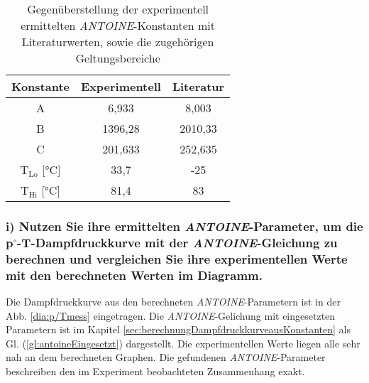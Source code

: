 \begin{table}[h!]
	\centering
	\caption{Gegenüberstellung der experimentell ermittelten \textit{ANTOINE}-Konstanten mit Literaturwerten, sowie die zugehörigen Geltungsbereiche}
	\label{tab:AntoineKonstanten}
	\begin{tabular}{|c|c|c|}
		\hline
			\textbf{Konstante} & \textbf{Experimentell} & \textbf{Literatur} \\ 
			\hline
			A & 6,933 & 8,003 \\ 
			B & 1396,28 & 2010,33 \\ 
			C & 201,633 & 252,635\\
		\hline
		\hline
		T$_\text{Lo}$ [\si{\degreeCelsius}]&33,7&-25\\
	T$_\text{Hi}$ [\si{\degreeCelsius}]	&81,4&83\\
	\hline
	\end{tabular}
\end{table}
\FloatBarrier
\vspace*{-2.5mm}
\subsubsection*{i{)} Nutzen Sie ihre ermittelten \textit{ANTOINE}-Parameter, um die p$^\circ$-T-Dampfdruckkurve mit der \textit{ANTOINE}-Gleichung zu berechnen und vergleichen Sie ihre experimentellen Werte mit den berechneten Werten im Diagramm.}
Die Dampfdruckkurve aus den berechneten \textit{ANTOINE}-Parametern ist in der Abb. \ref{dia:p/Tmess} eingetragen. Die \textit{ANTOINE}-Gelichung mit eingesetzten Parametern ist im Kapitel \ref{sec:berechnungDampfdruckkurveausKonstanten} als Gl. (\ref{gl:antoineEingesetzt}) dargestellt. Die experimentellen Werte liegen alle sehr nah an dem berechneten Graphen. Die gefundenen \textit{ANTOINE}-Parameter beschreiben den im Experiment beobachteten Zusammenhang exakt.